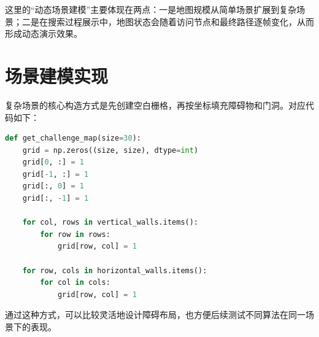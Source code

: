 这里的“动态场景建模”主要体现在两点：一是地图规模从简单场景扩展到复杂场景；二是在搜索过程展示中，地图状态会随着访问节点和最终路径逐帧变化，从而形成动态演示效果。

\section{场景建模实现}

复杂场景的核心构造方式是先创建空白栅格，再按坐标填充障碍物和门洞。对应代码如下：

\begin{lstlisting}[language=Python,caption={30x30 场景图的构造方式},label={code:map}]
def get_challenge_map(size=30):
    grid = np.zeros((size, size), dtype=int)
    grid[0, :] = 1
    grid[-1, :] = 1
    grid[:, 0] = 1
    grid[:, -1] = 1

    for col, rows in vertical_walls.items():
        for row in rows:
            grid[row, col] = 1

    for row, cols in horizontal_walls.items():
        for col in cols:
            grid[row, col] = 1
\end{lstlisting}

通过这种方式，可以比较灵活地设计障碍布局，也方便后续测试不同算法在同一场景下的表现。
